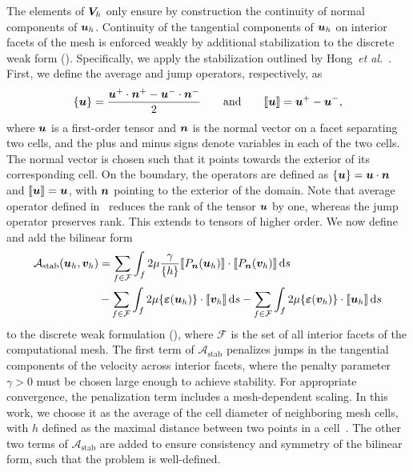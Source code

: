 \documentclass{WileyMSP-template}
\begin{document}
The elements of $\bm{V}_h$ only ensure by construction the continuity of normal components of $\bm{u}_h$.
Continuity of the tangential components of $\bm{u}_h$ on interior facets of
the mesh is enforced weakly by additional stabilization to 
the discrete weak form ().
Specifically, we apply the stabilization outlined by Hong~\emph{et al.}~\cite{Hong2016AEquations}.
First, we define the average and jump operators, respectively, as
\begin{equation}
    \{\bm{u}\} = \frac{\bm{u}^+\cdot\bm{n}^+ - \bm{u}^-\cdot\bm{n}^-}{2}
    \qquad\mathrm{and}\qquad \llbracket\bm{u}\rrbracket = \bm{u}^+ - \bm{u}^-,
    \label{eq:operators_BDM}
\end{equation}
where $\bm{u}$ is a first-order tensor and 
$\bm{n}$ is the normal vector on a facet separating two cells,
and the plus and minus signs denote variables in each of the two cells.
The normal vector is chosen such that it points towards the exterior of
its corresponding cell. On the boundary, the operators are defined as
$\{\bm{u}\} = \bm{u}\cdot\bm{n}$ and $\llbracket\bm{u}\rrbracket = \bm{u}$,
with $\bm{n}$ pointing to the exterior of the domain. Note that average operator
defined in~ reduces the rank of the tensor $\bm{u}$ by one,
whereas the jump operator preserves rank. This extends to tensors of higher order.
We now define and add the bilinear form
\begin{align*}
    \mathcal{A}_{\mathrm{stab}}(\bm{u}_h, \bm{v}_h) &=
    \sum_{f\in \mathcal{F}}\int_f{2\mu\frac{\gamma}{\{h\}}\llbracket P_{\bm{n}}(\bm{u}_h)\rrbracket
    \cdot\llbracket P_{\bm{n}}(\bm{v}_h)\rrbracket}\,\mathrm ds\\
    &-\sum_{f\in \mathcal{F}}\int_f{2\mu\{\bm{\varepsilon}(\bm{u}_h)\}\cdot\llbracket\bm{v}_h\rrbracket}\,\mathrm ds
    -\sum_{f\in \mathcal{F}}\int_f{2\mu\{\bm{\varepsilon}(\bm{v}_h)\}\cdot\llbracket\bm{u}_h\rrbracket}\,\mathrm ds
\end{align*}
to the discrete weak formulation (),
where $\mathcal{F}$ is the set of all interior facets of the computational mesh.
The first term of $\mathcal{A}_{\mathrm{stab}}$ penalizes jumps
in the tangential components of the velocity
across interior facets, where the penalty parameter $\gamma>0$ must be chosen large enough
to achieve stability. For appropriate convergence, the penalization term
includes a mesh-dependent scaling. In this work,
we choose it as the average of the cell diameter of neighboring mesh cells,
with $h$ defined as the maximal distance between two points in a cell~\cite{Nitsche1971UberSind}.
The other two terms
of $\mathcal{A}_{\mathrm{stab}}$ are added to ensure consistency and symmetry of
the bilinear form, such that the problem is well-defined.
\end{document}

